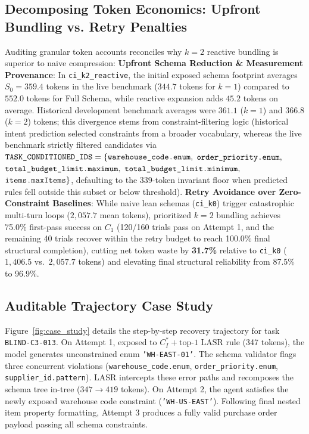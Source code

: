 \subsection{Decomposing Token Economics: Upfront Bundling vs. Retry Penalties}
Auditing granular token accounts reconciles why $k=2$ reactive bundling is superior to naive compression:
\noindent\textbf{Upfront Schema Reduction \& Measurement Provenance}: In \texttt{ci\_k2\_reactive}, the initial exposed schema footprint averages $S_0 = 359.4$ tokens in the live benchmark ($344.7$ tokens for $k=1$) compared to $552.0$ tokens for Full Schema, while reactive expansion adds $45.2$ tokens on average. Historical development benchmark averages were $361.1$ ($k=1$) and $366.8$ ($k=2$) tokens; this divergence stems from constraint-filtering logic (historical intent prediction selected constraints from a broader vocabulary, whereas the live benchmark strictly filtered candidates via $\texttt{TASK\_CONDITIONED\_IDS} = \{\text{\texttt{warehouse\_code.enum}},$ $\text{\texttt{order\_priority.enum}},$ $\text{\texttt{total\_budget\_limit.maximum}},$ $\text{\texttt{total\_budget\_limit.minimum}},$ $\text{\texttt{items.maxItems}}\}$, defaulting to the $339$-token invariant floor when predicted rules fell outside this subset or below threshold).
\noindent\textbf{Retry Avoidance over Zero-Constraint Baselines}: While naive lean schemas (\texttt{ci\_k0}) trigger catastrophic multi-turn loops ($2,057.7$ mean tokens), prioritized $k=2$ bundling achieves 75.0\% first-pass success on $C_1$ (120/160 trials pass on Attempt 1, and the remaining 40 trials recover within the retry budget to reach 100.0\% final structural completion), cutting net token waste by \textbf{31.7\%} relative to \texttt{ci\_k0} ($1,406.5$ vs.\ $2,057.7$ tokens) and elevating final structural reliability from 87.5\% to 96.9\%.


\subsection{Auditable Trajectory Case Study}
Figure~\ref{fig:case_study} details the step-by-step recovery trajectory for task \texttt{BLIND-C3-013}. On Attempt 1, exposed to $C_I^* + \text{top-1 LASR rule}$ (347 tokens), the model generates unconstrained enum \texttt{'WH-EAST-01'}. The schema validator flags three concurrent violations (\texttt{warehouse\_code.enum}, \texttt{order\_priority.enum}, \texttt{supplier\_id.pattern}). LASR intercepts these error paths and recomposes the schema tree in-tree ($347 \rightarrow 419$ tokens). On Attempt 2, the agent satisfies the newly exposed warehouse code constraint (\texttt{'WH-US-EAST'}). Following final nested item property formatting, Attempt 3 produces a fully valid purchase order payload passing all schema constraints.

